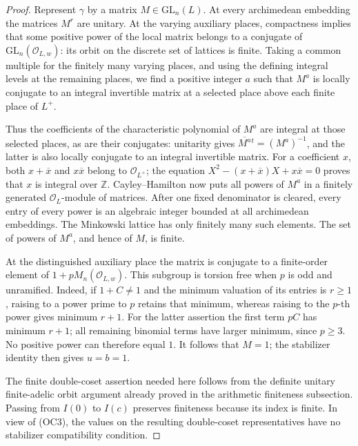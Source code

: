 \begin{proof}
Represent \(\gamma\) by a matrix \(M\in\mathrm{GL}_n(L)\).
At every archimedean embedding the matrices \(M^r\) are unitary.
At the varying auxiliary places, compactness implies that some positive
power of the local matrix belongs to a conjugate of
\(\mathrm{GL}_n(\mathcal O_{L,w})\): its orbit on the discrete set of
lattices is finite.  Taking a common multiple for the finitely many
varying places, and using the defining integral levels at the remaining
places, we find a positive integer \(a\) such that \(M^a\) is locally
conjugate to an integral invertible matrix at a selected place above
each finite place of \(L^+\).

Thus the coefficients of the characteristic polynomial of \(M^a\)
are integral at those selected places, as are their conjugates:
unitarity gives \(\overline{M^a}{}^t=(M^a)^{-1}\), and the latter is
also locally conjugate to an integral invertible matrix.
For a coefficient \(x\), both
\(x+\overline x\) and \(x\overline x\) belong to \(\mathcal O_{L^+}\);
the equation
\(X^2-(x+\overline x)X+x\overline x=0\) proves that \(x\) is integral
over \(\mathbb Z\).  Cayley--Hamilton now puts all powers of \(M^a\)
in a finitely generated \(\mathcal O_L\)-module of matrices.
After one fixed denominator is cleared, every entry of every power
is an algebraic integer bounded at all archimedean embeddings.
The Minkowski lattice has only finitely many such elements.
The set of powers of \(M^a\), and hence of \(M\), is finite.

At the distinguished auxiliary place the matrix is conjugate to a
finite-order element of \(1+pM_n(\mathcal O_{L,w})\).
This subgroup is torsion free when \(p\) is odd and unramified.
Indeed, if \(1+C\ne1\) and the minimum valuation of its entries is
\(r\geq1\), raising to a power prime to \(p\) retains that minimum,
whereas raising to the \(p\)-th power gives minimum \(r+1\).
For the latter assertion the first term \(pC\) has minimum \(r+1\);
all remaining binomial terms have larger minimum, since \(p\geq3\).
No positive power can therefore equal \(1\).
It follows that \(M=1\); the stabilizer identity then gives \(u=b=1\).

The finite double-coset assertion needed here follows from the definite
unitary finite-adelic orbit argument already proved in the arithmetic
finiteness subsection.  Passing from \(I(0)\) to \(I(c)\) preserves
finiteness because its index is finite.  In view of (OC3), the values on
the resulting double-coset representatives have no stabilizer
compatibility condition.
\end{proof}

